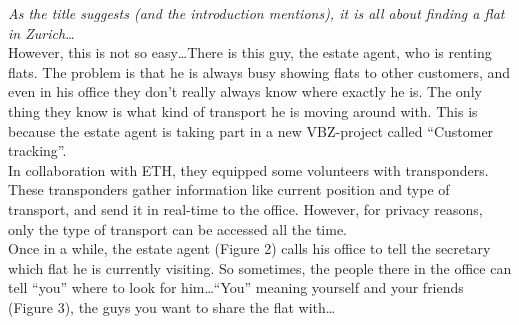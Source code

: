 \emph{As the title suggests (and the introduction mentions), it is all about finding a flat in Zurich\ldots}\\

However, this is not so easy\ldots There is this guy, the estate agent, who is renting flats. The problem is that he is always busy showing flats to other customers, and even in his office they don't really always know where exactly he is. The only thing they know is what kind of transport he is moving around with. This is because the estate agent is taking part in a new VBZ-project called ``Customer tracking''.\\

In collaboration with ETH, they equipped some volunteers with transponders. These transponders gather information like current position and type of transport, and send it in real-time to the office. However, for privacy reasons, only the type of transport can be accessed all the time.\\

Once in a while, the estate agent (Figure 2) calls his office to tell the secretary which flat he is currently visiting. So sometimes, the people there in the office can tell ``you'' where to look for him\ldots ``You'' meaning yourself and your friends (Figure 3), the guys you want to share the flat with\ldots 

